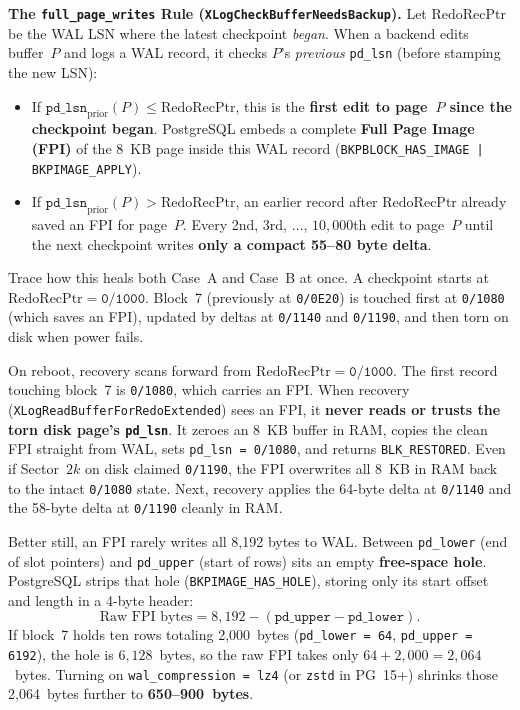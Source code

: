\begin{formalbox}
\textbf{The \texttt{full\_page\_writes} Rule (\texttt{XLogCheckBufferNeedsBackup}).}
Let $\mathrm{RedoRecPtr}$ be the WAL LSN where the latest checkpoint \emph{began}. When a backend edits buffer~$P$ and logs a WAL record, it checks $P$'s \emph{previous} \texttt{pd\_lsn} (before stamping the new LSN):
\begin{itemize}
  \item If $\texttt{pd\_lsn}_{\text{prior}}(P) \le \mathrm{RedoRecPtr}$, this is the \textbf{first edit to page~$P$ since the checkpoint began}. PostgreSQL embeds a complete \textbf{Full Page Image (FPI)} of the 8~KB page inside this WAL record (\texttt{BKPBLOCK\_HAS\_IMAGE | BKPIMAGE\_APPLY}).
  \item If $\texttt{pd\_lsn}_{\text{prior}}(P) > \mathrm{RedoRecPtr}$, an earlier record after $\mathrm{RedoRecPtr}$ already saved an FPI for page~$P$. Every 2nd, 3rd, $\dots$, $10{,}000$th edit to page~$P$ until the next checkpoint writes \textbf{only a compact 55--80 byte delta}.
\end{itemize}
\end{formalbox}

Trace how this heals both Case~A and Case~B at once. A checkpoint starts at $\mathrm{RedoRecPtr} = \texttt{0/1000}$. Block~7 (previously at \texttt{0/0E20}) is touched first at \texttt{0/1080} (which saves an FPI), updated by deltas at \texttt{0/1140} and \texttt{0/1190}, and then torn on disk when power fails.

On reboot, recovery scans forward from $\mathrm{RedoRecPtr} = \texttt{0/1000}$. The first record touching block~7 is \texttt{0/1080}, which carries an FPI. When recovery (\texttt{XLogReadBufferForRedoExtended}) sees an FPI, it \textbf{never reads or trusts the torn disk page's \texttt{pd\_lsn}}. It zeroes an 8~KB buffer in RAM, copies the clean FPI straight from WAL, sets \texttt{pd\_lsn = 0/1080}, and returns \texttt{BLK\_RESTORED}. Even if Sector~$2k$ on disk claimed \texttt{0/1190}, the FPI overwrites all 8~KB in RAM back to the intact \texttt{0/1080} state. Next, recovery applies the 64-byte delta at \texttt{0/1140} and the 58-byte delta at \texttt{0/1190} cleanly in RAM.

Better still, an FPI rarely writes all 8,192 bytes to WAL. Between \texttt{pd\_lower} (end of slot pointers) and \texttt{pd\_upper} (start of rows) sits an empty \textbf{free-space hole}. PostgreSQL strips that hole (\texttt{BKPIMAGE\_HAS\_HOLE}), storing only its start offset and length in a 4-byte header:
\[
  \text{Raw FPI bytes} = 8{,}192 - (\texttt{pd\_upper} - \texttt{pd\_lower}).
\]
If block~7 holds ten rows totaling 2,000~bytes (\texttt{pd\_lower = 64}, \texttt{pd\_upper = 6192}), the hole is $6{,}128$~bytes, so the raw FPI takes only $64 + 2{,}000 = 2{,}064$~bytes. Turning on \texttt{wal\_compression = lz4} (or \texttt{zstd} in PG~15+) shrinks those 2,064~bytes further to \textbf{650--900~bytes}.

